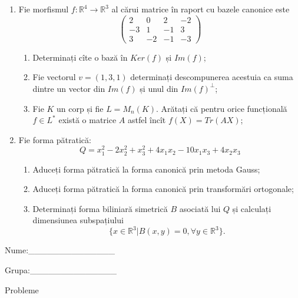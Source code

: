 \documentclass{article}
\begin{document}
\begin{enumerate}
 \item Fie morfismul $f:\mathbb{R}^4 \to \mathbb{R}^3$ al cărui matrice în raport cu bazele canonice este
$$\begin{pmatrix}
2&0&2&-2\\
-3&1&-1&3\\
3&-2&-1&-3
\end{pmatrix}$$

\begin{enumerate}
\item Determinați cîte o bază în $Ker(f)$ și $Im(f)$;
\item Fie vectorul $v=(1,3,1)$ determinați descompunerea acestuia ca suma dintre un vector din $Im(f)$ și unul din $Im(f)^\perp$;
\item Fie $K$ un corp și fie $L=M_n(K)$. Arătați că pentru orice funcțională $f \in L^*$ există o matrice $A$ astfel încît $f(X)=Tr(AX)$;
\end{enumerate}
\item Fie forma pătratică:
$$Q= x_1^2-2x_2^2+x_3^2+4x_1x_2-10x_1x_3+4x_2x_3$$

\begin{enumerate}
\item Aduceți forma pătratică la forma canonică prin metoda Gauss;
\item Aduceți forma pătratică la forma canonică prin transformări ortogonale;
\item Determinați forma biliniară simetrică $B$ asociată lui $Q$ și calculați dimensiunea subspațiului
$$\{x \in \mathbb{R}^3 | B(x,y)=0,\forall y \in \mathbb{R}^3\}.$$

\end{enumerate}
\end{enumerate}
\newpage
\begin{flushright}
Nume:\_\_\_\_\_\_\_\_\_\_\_\_\_\_
 
 
Grupa:\_\_\_\_\_\_\_\_\_\_\_\_\_\_
\end{flushright}
\begin{center}
\vspace{2cm}
{\Large Probleme}
\vspace{2cm}
\end{center}
\end{document}
